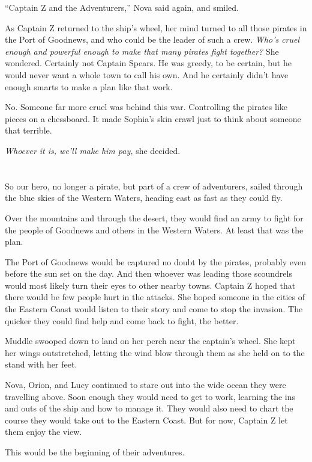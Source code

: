 \documentclass[12pt]{extbook}
\begin{document}
  \enquote{Captain Z and the Adventurers,} Nova said again, and smiled.
  
  As Captain Z returned to the ship's wheel, her mind turned to all those
  pirates in the Port of Goodnews, and who could be the leader of such a
  crew. \emph{Who's cruel enough and powerful enough to make that many
  pirates fight together?} She wondered. Certainly not Captain Spears. He
  was greedy, to be certain, but he would never want a whole town to call
  his own. And he certainly didn't have enough smarts to make a plan like
  that work.
  
  No. Someone far more cruel was behind this war. Controlling the pirates
  like pieces on a chessboard. It made Sophia's skin crawl just to think
  about someone that terrible.
  
  \emph{Whoever it is, we'll make him pay,} she decided.
  
  \section{}\label{section-45}
  
  So our hero, no longer a pirate, but part of a crew of adventurers,
  sailed through the blue skies of the Western Waters, heading east as
  fast as they could fly.
  
  Over the mountains and through the desert, they would find an army to
  fight for the people of Goodnews and others in the Western Waters. At
  least that was the plan.
  
  The Port of Goodnews would be captured no doubt by the pirates, probably
  even before the sun set on the day. And then whoever was leading those
  scoundrels would most likely turn their eyes to other nearby towns.
  Captain Z hoped that there would be few people hurt in the attacks. She
  hoped someone in the cities of the Eastern Coast would listen to their
  story and come to stop the invasion. The quicker they could find help
  and come back to fight, the better.
  
  Muddle swooped down to land on her perch near the captain's wheel. She
  kept her wings outstretched, letting the wind blow through them as she
  held on to the stand with her feet.
  
  Nova, Orion, and Lucy continued to stare out into the wide ocean they
  were travelling above. Soon enough they would need to get to work,
  learning the ins and outs of the ship and how to manage it. They would
  also need to chart the course they would take out to the Eastern Coast.
  But for now, Captain Z let them enjoy the view.
  
  This would be the beginning of their adventures.
\end{document}
